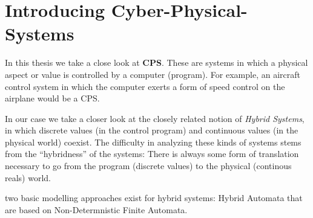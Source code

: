 \section{Introducing Cyber-Physical-Systems}
In this thesis we take a close look at \textbf{CPS}. These are systems in which a physical aspect or value is controlled by a computer (program). For example, an aircraft control system in which the computer exerts a form of speed control on the airplane would be a CPS. 

In our case we take a closer look at the closely related notion of \textit{Hybrid Systems}, in which discrete values (in the control program) and continuous values (in the physical world) coexist. The difficulty in analyzing these kinds of systems stems from the ``hybridness'' of the systems: There is always some form of translation necessary to go from the program (discrete values) to the physical (continous reals) world. 

 two basic modelling approaches exist for hybrid systems: Hybrid Automata that are based on Non-Determnistic Finite Automata.





